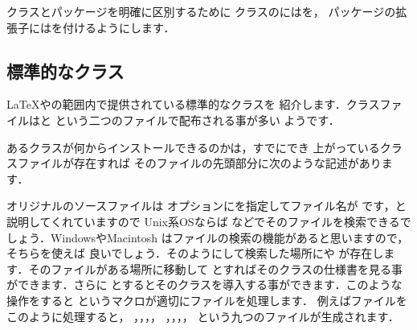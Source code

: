 
クラスとパッケージを明確に区別するために
クラスのにはを，
パッケージの拡張子にはを付けるようにします．

\subsection{標準的なクラス}

%
{\LaTeX}や{\pLaTeX}の範囲内で提供されている標準的なクラスを
紹介します．クラスファイルはと
という二つのファイルで配布される事が多い
ようです．

あるクラスが何からインストールできるのかは，すでにでき
上がっているクラスファイルが存在すれば
そのファイルの先頭部分に次のような記述があります．

\begin{intext}
\end{intext}

オリジナルのソースファイルは
オプションにを指定してファイル名が
です，と説明してくれていますので
Unix系OSならば
などでそのファイルを検索できるでしょう．WindowsやMacintosh
はファイルの検索の機能があると思いますので，そちらを使えば
良いでしょう．そのようにして検索した場所にや
が存在します．そのファイルがある場所に移動して
とすればそのクラスの仕様書を見る事ができます．さらに
とするとそのクラスを導入する事ができます．このような操作をすると
というマクロが適切にファイルを処理します．
例えばファイルをこのように処理すると，
，，，，
，，，，
という九つのファイルが生成されます．

